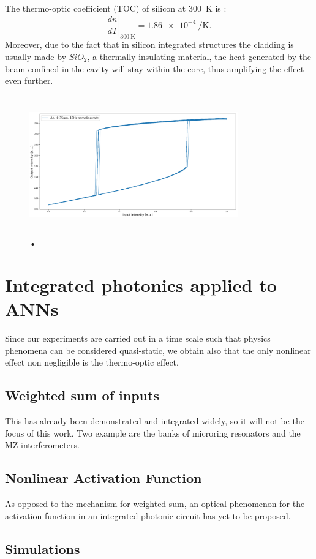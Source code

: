 The thermo-optic coefficient (TOC) of silicon at \SI{300}{\K} is \cite{??} :
\begin{equation}
	\left.\dfrac{dn}{dT}\right|_{\SI{300}{\K}} = \SI{1.86e-4}{\per\K}.
	\label{eq:Si_TOC}
\end{equation}
Moreover, due to the fact that in silicon integrated structures the cladding is usually made by $SiO_2$, a thermally insulating material, the heat generated by the beam confined in the cavity will stay within the core, thus amplifying the effect even further.

\begin{figure}[!htbp]
	\centering
	\includegraphics[draft,width=9cm,height=6cm]{figures/foo.png}
	\caption{•}
	\label{fig:NL_effects}
\end{figure}

\section{Integrated photonics applied to ANNs}
\label{sec:Integrated_photonics_applied_to_ANNs}
Since our experiments are carried out in a time scale such that physics phenomena can be considered quasi-static, we obtain also that the only nonlinear effect non negligible is the thermo-optic effect.

\subsection{Weighted sum of inputs}
\label{ssec:Weighted_Sum_of_inputs}
This has already been demonstrated and integrated widely, so it will not be the focus of this work.
Two example are the banks of microring resonators and the MZ interferometers.

\subsection{Nonlinear Activation Function}
\label{ssec:Nonlinear_Activation_Function}
As opposed to the mechanism for weighted sum, an optical phenomenon for the activation function in an integrated photonic circuit has yet to be proposed.

\subsection{Simulations}
\label{ssec:Simulations}

\begin{figure}[ht]
	\centering
	
	\caption{}
\end{figure}

\begin{figure}[ht]
	\centering
	
	\caption{}
\end{figure}